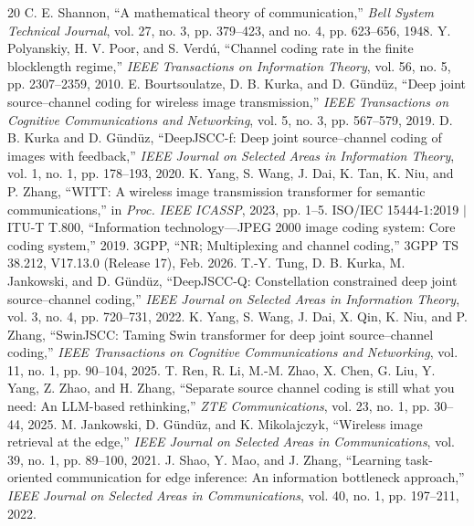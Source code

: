 \documentclass[conference]{IEEEtran}
\begin{document}
\begin{thebibliography}{20}
 C. E. Shannon, ``A mathematical theory of communication,'' \emph{Bell System Technical Journal}, vol. 27, no. 3, pp. 379--423, and no. 4, pp. 623--656, 1948.
 Y. Polyanskiy, H. V. Poor, and S. Verd\'u, ``Channel coding rate in the finite blocklength regime,'' \emph{IEEE Transactions on Information Theory}, vol. 56, no. 5, pp. 2307--2359, 2010.
 E. Bourtsoulatze, D. B. Kurka, and D. G\"und\"uz, ``Deep joint source--channel coding for wireless image transmission,'' \emph{IEEE Transactions on Cognitive Communications and Networking}, vol. 5, no. 3, pp. 567--579, 2019.
 D. B. Kurka and D. G\"und\"uz, ``DeepJSCC-f: Deep joint source--channel coding of images with feedback,'' \emph{IEEE Journal on Selected Areas in Information Theory}, vol. 1, no. 1, pp. 178--193, 2020.
 K. Yang, S. Wang, J. Dai, K. Tan, K. Niu, and P. Zhang, ``WITT: A wireless image transmission transformer for semantic communications,'' in \emph{Proc. IEEE ICASSP}, 2023, pp. 1--5.
 ISO/IEC 15444-1:2019 $|$ ITU-T T.800, ``Information technology---JPEG 2000 image coding system: Core coding system,'' 2019.
 3GPP, ``NR; Multiplexing and channel coding,'' 3GPP TS 38.212, V17.13.0 (Release 17), Feb. 2026.
 T.-Y. Tung, D. B. Kurka, M. Jankowski, and D. G\"und\"uz, ``DeepJSCC-Q: Constellation constrained deep joint source--channel coding,'' \emph{IEEE Journal on Selected Areas in Information Theory}, vol. 3, no. 4, pp. 720--731, 2022.
 K. Yang, S. Wang, J. Dai, X. Qin, K. Niu, and P. Zhang, ``SwinJSCC: Taming Swin transformer for deep joint source--channel coding,'' \emph{IEEE Transactions on Cognitive Communications and Networking}, vol. 11, no. 1, pp. 90--104, 2025.
 T. Ren, R. Li, M.-M. Zhao, X. Chen, G. Liu, Y. Yang, Z. Zhao, and H. Zhang, ``Separate source channel coding is still what you need: An LLM-based rethinking,'' \emph{ZTE Communications}, vol. 23, no. 1, pp. 30--44, 2025.
 M. Jankowski, D. G\"und\"uz, and K. Mikolajczyk, ``Wireless image retrieval at the edge,'' \emph{IEEE Journal on Selected Areas in Communications}, vol. 39, no. 1, pp. 89--100, 2021.
 J. Shao, Y. Mao, and J. Zhang, ``Learning task-oriented communication for edge inference: An information bottleneck approach,'' \emph{IEEE Journal on Selected Areas in Communications}, vol. 40, no. 1, pp. 197--211, 2022.

\end{thebibliography}
\end{document}
